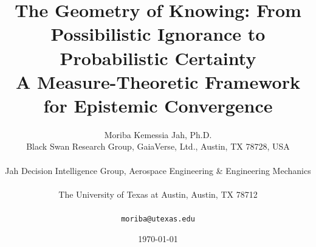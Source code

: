 \documentclass[12pt]{article}
\begin{document}
\title{The Geometry of Knowing: From Possibilistic Ignorance to Probabilistic Certainty\\[6pt]
\large A Measure-Theoretic Framework for Epistemic Convergence}

\author{Moriba Kemessia Jah, Ph.D.\\[4pt]
\small Black Swan Research Group, GaiaVerse, Ltd., Austin, TX 78728, USA\\\\
\small Jah Decision Intelligence Group, Aerospace Engineering \& Engineering Mechanics\\\\
\small The University of Texas at Austin, Austin, TX 78712\\\\
\small \texttt{moriba@utexas.edu}}

\date{\today}

\maketitle
\end{document}
